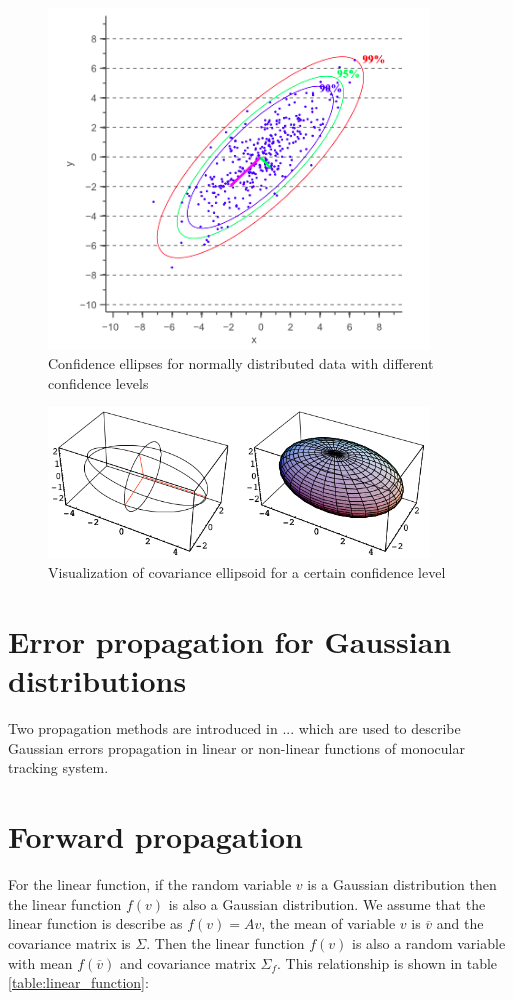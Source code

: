 \begin{figure}[h!]
\centering
\includegraphics[width=0.9\textwidth]{./fig/confidence2D.png}
\caption{Confidence ellipses for normally distributed data with different confidence levels\cite{vincent_spruyt}} 
\label{fig:confidence2D}
\end{figure}


\begin{figure}[h!]
\centering
\includegraphics[width=0.9\textwidth]{./fig/ellipsoid.png}
    \caption{Visualization of covariance ellipsoid for a certain confidence level\cite{bauer2007tracking}}
\label{fig:ellipsoid}
\end{figure}

\section{Error propagation for Gaussian distributions} 
Two propagation methods are introduced in ...%
which are used to describe Gaussian errors propagation in linear or non-linear functions of monocular tracking system.
\section{Forward propagation} 
For the linear function, if the random variable $\textit{v}$ is a Gaussian distribution then the linear function $f(v)$ is also a Gaussian distribution. We assume that the linear function is describe as $f(v) = Av$, the mean of variable $\textit{v}$ is $\overline{v}$ and the covariance matrix is $\Sigma$. Then the linear function $f(v)$ is also a random variable with mean $f(\overline{v})$ and covariance matrix $\Sigma_f$. This relationship is shown in table \ref{table:linear_function}:

